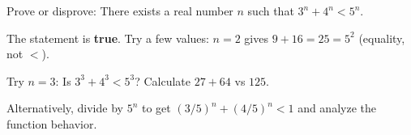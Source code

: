 
\begin{problem}
Prove or disprove: There exists a real number $n$ such that $3^n + 4^n < 5^n$.
\end{problem}

\begin{hint}
The statement is \textbf{true}. Try a few values: $n = 2$ gives $9 + 16 = 25 = 5^2$ (equality, not $<$).

Try $n = 3$: Is $3^3 + 4^3 < 5^3$? Calculate $27 + 64$ vs $125$.

Alternatively, divide by $5^n$ to get $(3/5)^n + (4/5)^n < 1$ and analyze the function behavior.
\end{hint}

